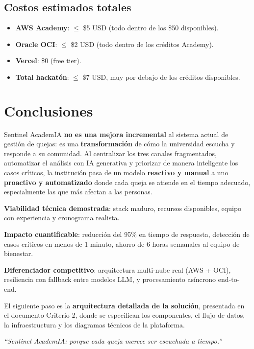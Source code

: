 \documentclass[11pt,a4paper]{article}
\begin{document}
\subsection{Costos estimados totales}

\begin{itemize}[leftmargin=*]
    \item \textbf{AWS Academy}: $\leq$ \$5 USD (todo dentro de los \$50 disponibles).
    \item \textbf{Oracle OCI}: $\leq$ \$2 USD (todo dentro de los cr\'editos Academy).
    \item \textbf{Vercel}: \$0 (free tier).
    \item \textbf{Total hackat\'on}: $\leq$ \$7 USD, muy por debajo de los cr\'editos disponibles.
\end{itemize}

\section{Conclusiones}

Sentinel AcademIA \textbf{no es una mejora incremental} al sistema actual de gesti\'on de quejas: es una \textbf{transformaci\'on} de c\'omo la universidad escucha y responde a su comunidad. Al centralizar los tres canales fragmentados, automatizar el an\'alisis con IA generativa y priorizar de manera inteligente los casos cr\'iticos, la instituci\'on pasa de un modelo \textbf{reactivo y manual} a uno \textbf{proactivo y automatizado} donde cada queja se atiende en el tiempo adecuado, especialmente las que m\'as afectan a las personas.

\textbf{Viabilidad t\'ecnica demostrada}: stack maduro, recursos disponibles, equipo con experiencia y cronograma realista.

\textbf{Impacto cuantificable}: reducci\'on del 95\% en tiempo de respuesta, detecci\'on de casos cr\'iticos en menos de 1 minuto, ahorro de 6 horas semanales al equipo de bienestar.

\textbf{Diferenciador competitivo}: arquitectura multi-nube real (AWS + OCI), resiliencia con fallback entre modelos LLM, y procesamiento as\'incrono end-to-end.

El siguiente paso es la \textbf{arquitectura detallada de la soluci\'on}, presentada en el documento Criterio 2, donde se especifican los componentes, el flujo de datos, la infraestructura y los diagramas t\'ecnicos de la plataforma.

\vspace{0.5cm}

\begin{center}
\textit{``Sentinel AcademIA: porque cada queja merece ser escuchada a tiempo.''}
\end{center}
\end{document}
